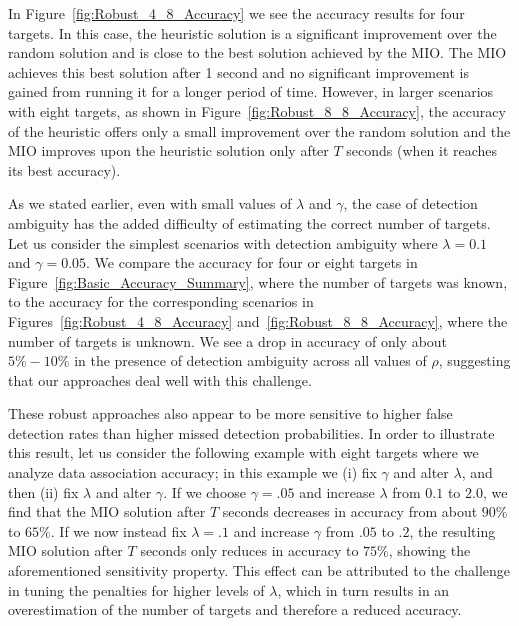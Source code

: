 In Figure~\ref{fig:Robust_4_8_Accuracy} we see the accuracy results for four targets. In this case, the heuristic solution is a significant improvement over the random solution and is close to the best solution achieved by the MIO. The MIO achieves this best solution after 1 second and no significant improvement is gained from running it for a longer period of time. However, in larger scenarios with eight targets, as shown in Figure~\ref{fig:Robust_8_8_Accuracy}, the accuracy of the heuristic offers only a small improvement over the random solution and the MIO improves upon the heuristic solution only after $T$ seconds (when it reaches its best accuracy). 

As we stated earlier, even with small values of $\lambda$ and $\gamma$, the case of detection ambiguity has the added difficulty of estimating the correct number of targets. Let us consider the simplest scenarios with detection ambiguity where $\lambda = 0.1$ and $\gamma=0.05$. We compare the accuracy for four or eight targets in Figure~\ref{fig:Basic_Accuracy_Summary}, where the number of targets was known, to the accuracy for the corresponding scenarios in Figures~\ref{fig:Robust_4_8_Accuracy} and~\ref{fig:Robust_8_8_Accuracy}, where the number of targets is unknown. We see a drop in accuracy of only about $5\%-10\%$ in the presence of detection ambiguity across all values of $\rho$, suggesting that our approaches deal well with this challenge. 

These robust approaches also appear to be more sensitive to higher false detection rates than higher missed detection probabilities. In order to illustrate this result, let us consider the following example with eight targets where we analyze data association accuracy; in this example we (i) fix $\gamma$ and alter $\lambda$, and then (ii) fix $\lambda$ and alter $\gamma$. If we choose $\gamma=.05$ and increase $\lambda$ from $0.1$ to $2.0$, we find that the MIO solution after $T$ seconds decreases in accuracy from about $90\%$ to $65\%$. If we now instead fix $\lambda=.1$ and increase $\gamma$ from $.05$ to $.2$, the resulting MIO solution after $T$ seconds only reduces in accuracy to $75\%$, showing the aforementioned sensitivity property. This effect can be attributed to the challenge in tuning the penalties for higher levels of $\lambda$, which in turn results in an overestimation of the number of targets and therefore a reduced accuracy. 

